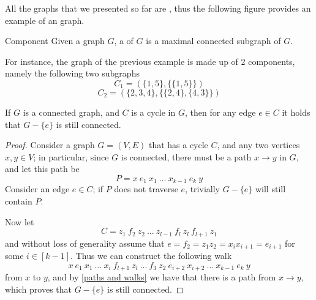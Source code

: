 \documentclass[a4paper, 12pt]{report}
\begin{document}
    All the graphs that we presented so far are , thus the following figure provides an example of an  graph.

    \begin{figure}[H]
        \centering
    \end{figure}

    \begin{frameddefn}{Component}
        Given a graph $G$, a  of $G$ is a maximal connected subgraph of $G$.
    \end{frameddefn}

    For instance, the graph of the previous example is made up of 2 components, namely the following two subgraphs $$C_1 = (\{1, 5\}, \{\{1, 5\}\})$$ $$C_2 = (\{2, 3, 4\}, \{\{2, 4\}, \{4, 3\}\})$$

    \begin{framedprop}[label={avoid cycle}]{}
        If $G$ is a connected graph, and $C$ is a cycle in $G$, then for any edge $e \in C$ it holds that $G - \{e\}$ is still connected.
    \end{framedprop}

    \begin{proof}
        Consider a graph $G = (V, E)$ that has a cycle $C$, and any two vertices $x, y \in V$; in particular, since $G$ is connected, there must be a path $x \to y$ in $G$, and let this path be $$P = x \ e_1 \ x_1 \ \ldots \ x_{k - 1} \ e_k \ y$$ Consider an edge $e \in C$; if $P$ does not traverse $e$, trivially $G - \{e\}$ will still contain $P$.

        Now let $$C = z_1 \ f_2 \ z_2 \ \ldots \ z_{l- 1} \ f_l \ z_l \ f_{l + 1} \ z_1$$ and without loss of generality assume that $e = f_2 = z_1 z_2 = x_i x_{i + 1} = e_{i + 1}$ for some $i \in [k - 1]$. Thus we can construct the following walk $$x \ e_1 \ x_1 \ \ldots \ x_i \ f_{l + 1} \ z_l \ \ldots \ f_3 \ z_2 \ e_{i + 2} \ x_{i + 2} \ \ldots \ x_{k - 1} \ e_k \ y$$ from $x$ to $y$, and by \cref{paths and walks} we have that there is a path from $x \to y$, which proves that $G - \{e\}$ is still connected.
    \end{proof}
\end{document}

